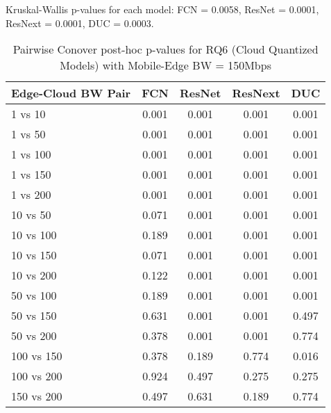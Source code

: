 \begin{table}[h]
\centering
\caption{Pairwise Conover post-hoc p-values for RQ6 (Cloud Quantized Models) with Mobile-Edge BW = 150Mbps}
\label{tab:conover_cloud_quantized_me150}
\smallskip
Kruskal-Wallis p-values for each model: FCN = 0.0058, ResNet = 0.0001, ResNext = 0.0001, DUC = 0.0003.

\begin{tabular}{lcccc}
\toprule
Edge-Cloud BW Pair & FCN & ResNet & ResNext & DUC \\
\midrule
1 vs 10 & 0.001 & 0.001 & 0.001 & 0.001 \\
1 vs 50 & 0.001 & 0.001 & 0.001 & 0.001 \\
1 vs 100 & 0.001 & 0.001 & 0.001 & 0.001 \\
1 vs 150 & 0.001 & 0.001 & 0.001 & 0.001 \\
1 vs 200 & 0.001 & 0.001 & 0.001 & 0.001 \\
10 vs 50 & 0.071 & 0.001 & 0.001 & 0.001 \\
10 vs 100 & 0.189 & 0.001 & 0.001 & 0.001 \\
10 vs 150 & 0.071 & 0.001 & 0.001 & 0.001 \\
10 vs 200 & 0.122 & 0.001 & 0.001 & 0.001 \\
50 vs 100 & 0.189 & 0.001 & 0.001 & 0.001 \\
50 vs 150 & 0.631 & 0.001 & 0.001 & 0.497 \\
50 vs 200 & 0.378 & 0.001 & 0.001 & 0.774 \\
100 vs 150 & 0.378 & 0.189 & 0.774 & 0.016 \\
100 vs 200 & 0.924 & 0.497 & 0.275 & 0.275 \\
150 vs 200 & 0.497 & 0.631 & 0.189 & 0.774 \\
\bottomrule
\end{tabular}
\end{table}

